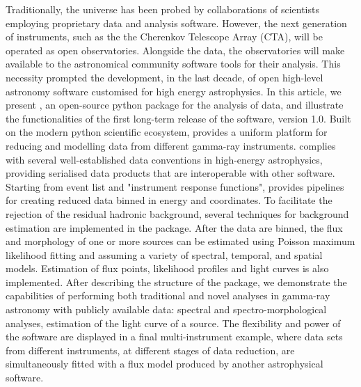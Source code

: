\documentclass[traditabstract, longauth]{aa}
\begin{document}

\abstract
	{
		Traditionally, the \gammaray universe has been probed
		by collaborations of scientists employing proprietary data and analysis software.
		However, the next generation of \gammaray instruments,
		such as the the Cherenkov Telescope Array (CTA), will be operated as open observatories.
		Alongside the data, the observatories will make available to the astronomical community
		software tools for their analysis. This necessity prompted the development, in the last decade,
		of open high-level astronomy software customised for high energy astrophysics.
	}
	{
		In this article, we present \gammapy, an open-source python package for the analysis of \gammaray data,
		and illustrate the functionalities of the first long-term release of the software, version 1.0.
		Built on the modern python scientific ecosystem, \gammapy provides a uniform platform for reducing and
		modelling data from different gamma-ray instruments. \gammapy complies with several well-established
		data conventions in high-energy astrophysics, providing serialised data products that are interoperable
		with other software.
	}
	{
		Starting from event list and "instrument response functions",
		\gammapy provides pipelines for creating reduced data binned in energy and coordinates.
		To facilitate the rejection of the residual hadronic background, several techniques for background estimation
		are implemented in the package.
		After the data are binned, the flux and morphology of one or more \gammaray sources can be estimated
		using Poisson maximum likelihood fitting
		and assuming a variety of spectral, temporal, and spatial models.
		Estimation of flux points, likelihood profiles and light curves is also implemented.
	}
	{
		After describing the structure of the package, we demonstrate the capabilities of \gammapy
		performing both traditional and novel analyses in gamma-ray astronomy with publicly available data:
		spectral and spectro-morphological analyses, estimation of the light curve of a source.
		The flexibility and power of the software are displayed in a final multi-instrument example,
		where data sets from different instruments, at different stages of data reduction,
		are simultaneously fitted with a flux model produced by another astrophysical software.
	}{}


\end{document}

